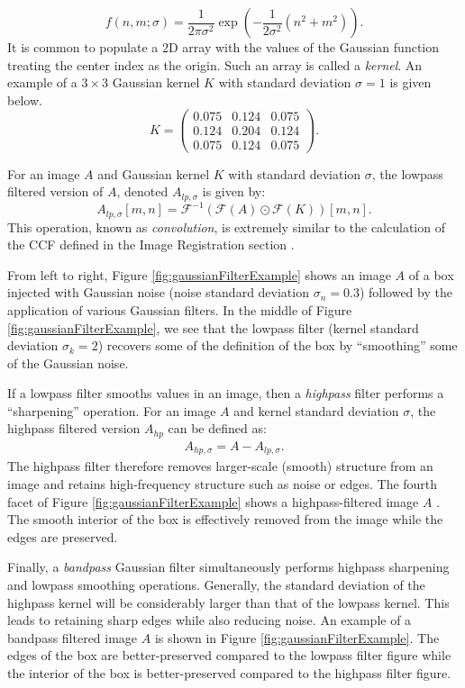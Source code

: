 \documentclass[11pt,]{isuthesis}
\begin{document}
\[
f(n,m;\sigma) = \frac{1}{2\pi\sigma^2} \exp\left(-\frac{1}{2\sigma^2}(n^2 + m^2)\right).
\]
It is common to populate a 2D array with the values of the Gaussian function treating the center index as the origin.
Such an array is called a \emph{kernel}.
An example of a \(3 \times 3\) Gaussian kernel \(K\) with standard deviation \(\sigma = 1\) is given below.
\[
K = 
\begin{pmatrix}
0.075 & 0.124 & 0.075 \\
0.124 & 0.204 & 0.124 \\
0.075 & 0.124 & 0.075
\end{pmatrix}.
\]

For an image \(A\) and Gaussian kernel \(K\) with standard deviation \(\sigma\), the lowpass filtered version of \(A\), denoted \(A_{lp,\sigma}\) is given by:
\[
A_{lp,\sigma}[m,n] = \mathcal{F}^{-1}\left(\mathcal{F}(A) \odot \mathcal{F}(K)\right)[m,n].
\]
This operation, known as \emph{convolution}, is extremely similar to the calculation of the CCF defined in the Image Registration section \citep{ISO1661021}.

From left to right, Figure \ref{fig:gaussianFilterExample} shows an image \(A\) of a box injected with Gaussian noise (noise standard deviation \(\sigma_n = 0.3\)) followed by the application of various Gaussian filters.
In the middle of Figure \ref{fig:gaussianFilterExample}, we see that the lowpass filter (kernel standard deviation \(\sigma_k = 2\)) recovers some of the definition of the box by ``smoothing'' some of the Gaussian noise.

If a lowpass filter smooths values in an image, then a \emph{highpass} filter performs a ``sharpening'' operation.
For an image \(A\) and kernel standard deviation \(\sigma\), the highpass filtered version \(A_{hp}\) can be defined as:
\begin{align*}
A_{hp,\sigma} = A - A_{lp,\sigma}.
\end{align*}
The highpass filter therefore removes larger-scale (smooth) structure from an image and retains high-frequency structure such as noise or edges.
The fourth facet of Figure \ref{fig:gaussianFilterExample} shows a highpass-filtered image \(A\) .
The smooth interior of the box is effectively removed from the image while the edges are preserved.

Finally, a \emph{bandpass} Gaussian filter simultaneously performs highpass sharpening and lowpass smoothing operations.
Generally, the standard deviation of the highpass kernel will be considerably larger than that of the lowpass kernel.
This leads to retaining sharp edges while also reducing noise.
An example of a bandpass filtered image \(A\) is shown in Figure \ref{fig:gaussianFilterExample}.
The edges of the box are better-preserved compared to the lowpass filter figure while the interior of the box is better-preserved compared to the highpass filter figure.
\end{document}
